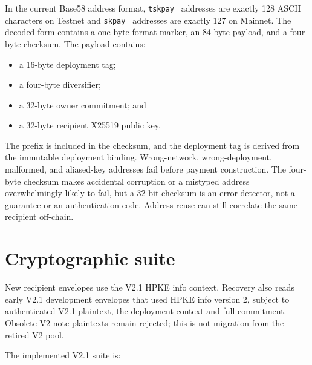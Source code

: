 \documentclass[11pt,letterpaper]{article}
\providecommand{\tightlist}{\setlength{\itemsep}{0pt}\setlength{\parskip}{0pt}}
\begin{document}
In the current Base58 address format, \texttt{tskpay\_} addresses are
exactly 128 ASCII characters on Testnet and \texttt{skpay\_} addresses
are exactly 127 on Mainnet. The decoded form contains a one-byte format
marker, an 84-byte payload, and a four-byte checksum. The payload
contains:

\begin{itemize}
\tightlist
\item
  a 16-byte deployment tag;
\item
  a four-byte diversifier;
\item
  a 32-byte owner commitment; and
\item
  a 32-byte recipient X25519 public key.
\end{itemize}

The prefix is included in the checksum, and the deployment tag is
derived from the immutable deployment binding. Wrong-network,
wrong-deployment, malformed, and aliased-key addresses fail before
payment construction. The four-byte checksum makes accidental corruption
or a mistyped address overwhelmingly likely to fail, but a 32-bit
checksum is an error detector, not a guarantee or an authentication
code. Address reuse can still correlate the same recipient off-chain.

\section{Cryptographic suite}\label{cryptographic-suite}

New recipient envelopes use the V2.1 HPKE info context. Recovery also
reads early V2.1 development envelopes that used HPKE info version 2,
subject to authenticated V2.1 plaintext, the deployment context and full
commitment. Obsolete V2 note plaintexts remain rejected; this is not
migration from the retired V2 pool.

The implemented V2.1 suite is:
\end{document}
